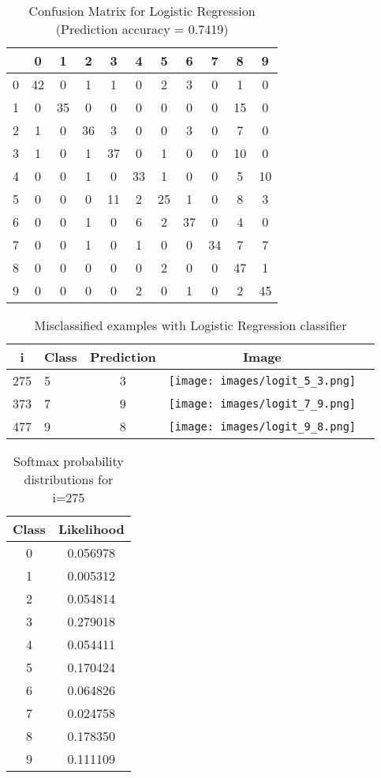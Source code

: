 \documentclass[11pt]{article}
\begin{document}
\begin{table}[!th]
\centering
\begin{tabular}{|c|cccccccccc|}
\hline
 & 0 & 1 & 2 & 3 & 4 & 5 & 6 & 7 & 8 & 9 \\
\hline
0 & 42 & 0 & 1 & 1 & 0 & 2 & 3 & 0 & 1 & 0 \\
1 & 0 & 35 & 0 & 0 & 0 & 0 & 0 & 0 & 15 & 0 \\
2 & 1 & 0 & 36 & 3 & 0 & 0 & 3 & 0 & 7 & 0 \\
3 & 1 & 0 & 1 & 37 & 0 & 1 & 0 & 0 & 10 & 0 \\
4 & 0 & 0 & 1 & 0 & 33 & 1 & 0 & 0 & 5 & 10 \\
5 & 0 & 0 & 0 & 11 & 2 & 25 & 1 & 0 & 8 & 3 \\
6 & 0 & 0 & 1 & 0 & 6 & 2 & 37 & 0 & 4 & 0 \\
7 & 0 & 0 & 1 & 0 & 1 & 0 & 0 & 34 & 7 & 7 \\
8 & 0 & 0 & 0 & 0 & 0 & 2 & 0 & 0 & 47 & 1 \\
9 & 0 & 0 & 0 & 0 & 2 & 0 & 1 & 0 & 2 & 45 \\
\hline
\end{tabular}
\caption{Confusion Matrix for Logistic Regression (Prediction accuracy = 0.7419)}
\label{ex:table}
\end{table}

\begin{table}[!th]
\centering
\begin{tabular}{|clc|c||c|}
\hline
i & Class & Prediction & Image \\
\hline
275 & 5 & 3 & \texttt{[image: images/logit\_5\_3.png]} \\
\hline
373 & 7 & 9 & \texttt{[image: images/logit\_7\_9.png]} \\
\hline
477 & 9 & 8 & \texttt{[image: images/logit\_9\_8.png]} \\
\hline
\end{tabular}
\caption{Misclassified examples with Logistic Regression classifier}
\label{ex:table}
\end{table}

\begin{table}[!th]
\centering
\begin{tabular}{|c|c|}
\hline
Class & Likelihood \\
\hline
0 & 0.056978 \\
1 & 0.005312 \\
2 & 0.054814 \\
3 & 0.279018 \\
4 & 0.054411 \\
5 & 0.170424 \\
6 & 0.064826 \\
7 & 0.024758 \\
8 & 0.178350 \\
9 & 0.111109 \\
\hline
\end{tabular}
\caption{Softmax probability distributions for i=275}
\label{ex:table}
\end{table}
\end{document}
